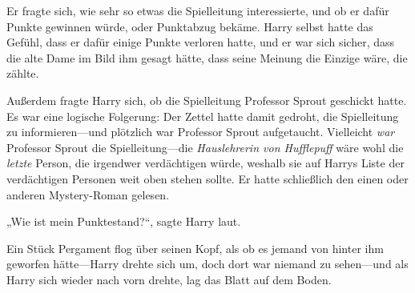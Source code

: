 Er fragte sich, wie sehr so etwas die Spielleitung interessierte, und ob er dafür Punkte gewinnen würde, oder Punktabzug bekäme. Harry selbst hatte das Gefühl, dass er dafür einige Punkte verloren hatte, und er war sich sicher, dass die alte Dame im Bild ihm gesagt hätte, dass seine Meinung die Einzige wäre, die zählte.

Außerdem fragte Harry sich, ob die Spielleitung Professor Sprout geschickt hatte. Es war eine logische Folgerung: Der Zettel hatte damit gedroht, die Spielleitung zu informieren—und plötzlich war Professor Sprout aufgetaucht. Vielleicht \emph{war} Professor Sprout die Spielleitung—die \emph{Hauslehrerin von Hufflepuff} wäre wohl die \emph{letzte} Person, die irgendwer verdächtigen würde, weshalb sie auf Harrys Liste der verdächtigen Personen weit oben stehen sollte. Er hatte schließlich den einen oder anderen Mystery-Roman gelesen.

„Wie ist mein Punktestand?“, sagte Harry laut.

Ein Stück Pergament flog über seinen Kopf, als ob es jemand von hinter ihm geworfen hätte—Harry drehte sich um, doch dort war niemand zu sehen—und als Harry sich wieder nach vorn drehte, lag das Blatt auf dem Boden.

